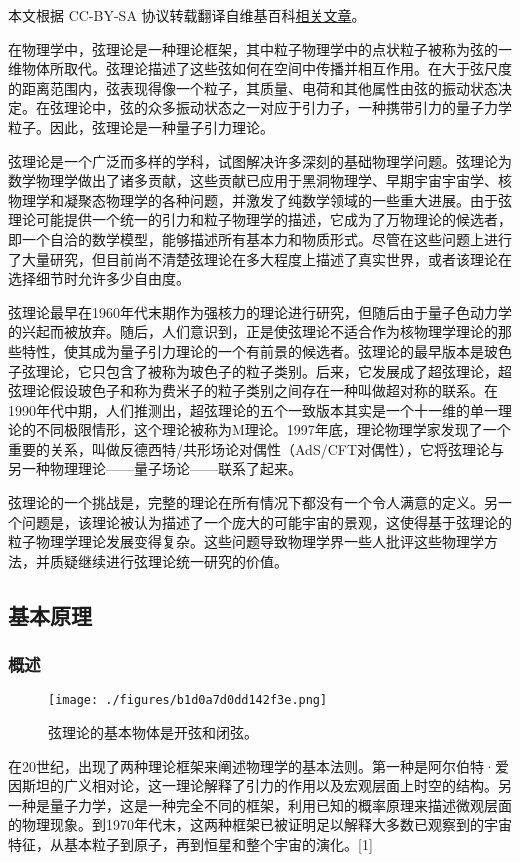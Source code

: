 
本文根据 CC-BY-SA 协议转载翻译自维基百科\href{https://en.wikipedia.org/wiki/String_theory}{相关文章}。

在物理学中，弦理论是一种理论框架，其中粒子物理学中的点状粒子被称为弦的一维物体所取代。弦理论描述了这些弦如何在空间中传播并相互作用。在大于弦尺度的距离范围内，弦表现得像一个粒子，其质量、电荷和其他属性由弦的振动状态决定。在弦理论中，弦的众多振动状态之一对应于引力子，一种携带引力的量子力学粒子。因此，弦理论是一种量子引力理论。

弦理论是一个广泛而多样的学科，试图解决许多深刻的基础物理学问题。弦理论为数学物理学做出了诸多贡献，这些贡献已应用于黑洞物理学、早期宇宙宇宙学、核物理学和凝聚态物理学的各种问题，并激发了纯数学领域的一些重大进展。由于弦理论可能提供一个统一的引力和粒子物理学的描述，它成为了万物理论的候选者，即一个自洽的数学模型，能够描述所有基本力和物质形式。尽管在这些问题上进行了大量研究，但目前尚不清楚弦理论在多大程度上描述了真实世界，或者该理论在选择细节时允许多少自由度。

弦理论最早在1960年代末期作为强核力的理论进行研究，但随后由于量子色动力学的兴起而被放弃。随后，人们意识到，正是使弦理论不适合作为核物理学理论的那些特性，使其成为量子引力理论的一个有前景的候选者。弦理论的最早版本是玻色子弦理论，它只包含了被称为玻色子的粒子类别。后来，它发展成了超弦理论，超弦理论假设玻色子和称为费米子的粒子类别之间存在一种叫做超对称的联系。在1990年代中期，人们推测出，超弦理论的五个一致版本其实是一个十一维的单一理论的不同极限情形，这个理论被称为M理论。1997年底，理论物理学家发现了一个重要的关系，叫做反德西特/共形场论对偶性（AdS/CFT对偶性），它将弦理论与另一种物理理论——量子场论——联系了起来。

弦理论的一个挑战是，完整的理论在所有情况下都没有一个令人满意的定义。另一个问题是，该理论被认为描述了一个庞大的可能宇宙的景观，这使得基于弦理论的粒子物理学理论发展变得复杂。这些问题导致物理学界一些人批评这些物理学方法，并质疑继续进行弦理论统一研究的价值。
\subsection{基本原理}
\subsubsection{概述}
\begin{figure}[ht]
\centering
\texttt{[image: ./figures/b1d0a7d0dd142f3e.png]}
\caption{弦理论的基本物体是开弦和闭弦。} \label{fig_String_1}
\end{figure}  
在20世纪，出现了两种理论框架来阐述物理学的基本法则。第一种是阿尔伯特·爱因斯坦的广义相对论，这一理论解释了引力的作用以及宏观层面上时空的结构。另一种是量子力学，这是一种完全不同的框架，利用已知的概率原理来描述微观层面的物理现象。到1970年代末，这两种框架已被证明足以解释大多数已观察到的宇宙特征，从基本粒子到原子，再到恒星和整个宇宙的演化。[1]

